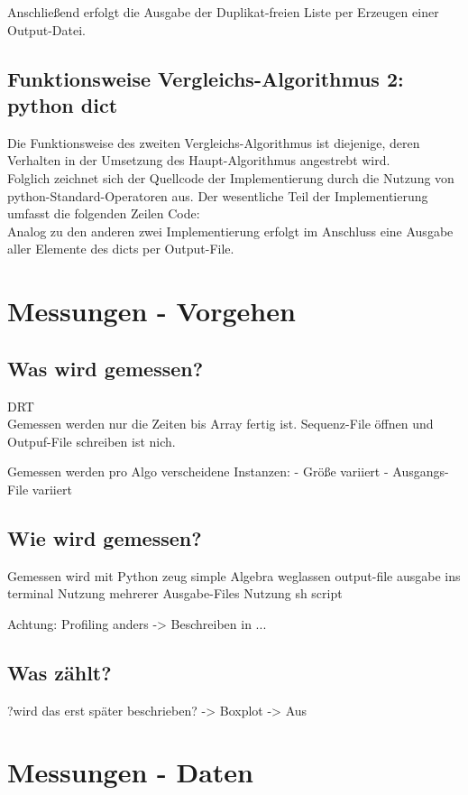 \documentclass[
10pt, %
a4paper, %
oneside, %
headinclude,footinclude, %
BCOR5mm, %
]{scrartcl}
\begin{document}
Anschließend erfolgt die Ausgabe der Duplikat-freien Liste per Erzeugen einer Output-Datei.


\subsection{Funktionsweise Vergleichs-Algorithmus 2: python dict}
Die Funktionsweise des zweiten Vergleichs-Algorithmus ist diejenige, deren Verhalten in der Umsetzung des Haupt-Algorithmus angestrebt wird.\\
Folglich zeichnet sich der Quellcode der Implementierung durch die Nutzung von python-Standard-Operatoren aus. Der wesentliche Teil der Implementierung umfasst die folgenden Zeilen Code:\\

Analog zu den anderen zwei Implementierung erfolgt im Anschluss eine Ausgabe aller Elemente des dicts per Output-File.

\section{Messungen - Vorgehen}
\subsection{Was wird gemessen?}
DRT\\
Gemessen werden nur die Zeiten bis Array fertig ist. Sequenz-File öffnen und Outpuf-File schreiben ist nich.

Gemessen werden pro Algo verscheidene Instanzen:
- Größe variiert
- Ausgangs-File variiert

\subsection{Wie wird gemessen?}
Gemessen wird mit Python zeug simple Algebra
weglassen output-file
ausgabe ins terminal
Nutzung mehrerer Ausgabe-Files 
Nutzung sh script

Achtung: Profiling anders -> Beschreiben in ...

\subsection{Was zählt?}
?wird das erst später beschrieben?
-> Boxplot
-> Aus
 
\section{Messungen - Daten}
\end{document}

